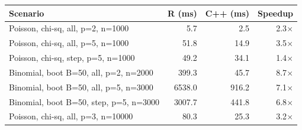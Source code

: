 \begin{tabular}{lrrr}
\toprule
Scenario & R (ms) & C++ (ms) & Speedup \\
\midrule
Poisson, chi-sq, all, p=2, n=1000 & 5.7 & 2.5 & 2.3$\times$ \\
Poisson, chi-sq, all, p=5, n=1000 & 51.8 & 14.9 & 3.5$\times$ \\
Poisson, chi-sq, step, p=5, n=1000 & 49.2 & 34.1 & 1.4$\times$ \\
Binomial, boot B=50, all, p=2, n=2000 & 399.3 & 45.7 & 8.7$\times$ \\
Binomial, boot B=50, all, p=5, n=3000 & 6538.0 & 916.2 & 7.1$\times$ \\
Binomial, boot B=50, step, p=5, n=3000 & 3007.7 & 441.8 & 6.8$\times$ \\
Poisson, chi-sq, all, p=3, n=10000 & 80.3 & 25.3 & 3.2$\times$ \\
\bottomrule
\end{tabular}
